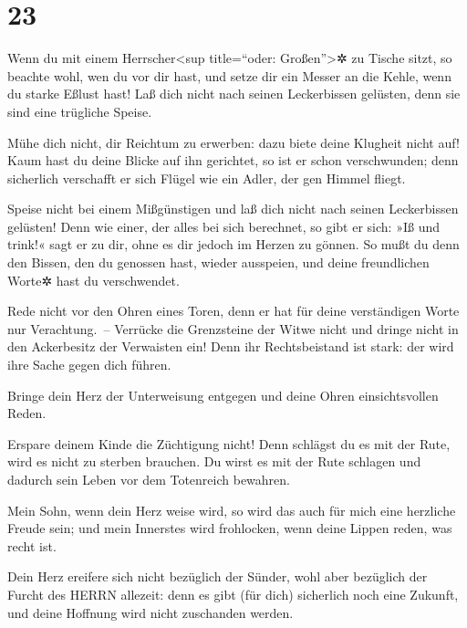 \hypertarget{section-22}{%
\section{23}\label{section-22}}

Wenn du mit einem Herrscher\textless sup title=``oder:
Großen''\textgreater✲ zu Tische sitzt, so beachte wohl, wen du vor dir
hast, und setze dir ein Messer an die Kehle, wenn du
starke Eßlust hast! Laß dich nicht nach seinen
Leckerbissen gelüsten, denn sie sind eine trügliche Speise.

Mühe dich nicht, dir Reichtum zu erwerben: dazu biete
deine Klugheit nicht auf! Kaum hast du deine Blicke auf
ihn gerichtet, so ist er schon verschwunden; denn sicherlich verschafft
er sich Flügel wie ein Adler, der gen Himmel fliegt.

Speise nicht bei einem Mißgünstigen und laß dich nicht
nach seinen Leckerbissen gelüsten! Denn wie einer, der
alles bei sich berechnet, so gibt er sich: »Iß und trink!« sagt er zu
dir, ohne es dir jedoch im Herzen zu gönnen. So mußt du
denn den Bissen, den du genossen hast, wieder ausspeien, und deine
freundlichen Worte✲ hast du verschwendet.

Rede nicht vor den Ohren eines Toren, denn er hat für
deine verständigen Worte nur Verachtung.~-- Verrücke die
Grenzsteine der Witwe nicht und dringe nicht in den Ackerbesitz der
Verwaisten ein! Denn ihr Rechtsbeistand ist stark: der
wird ihre Sache gegen dich führen.

Bringe dein Herz der Unterweisung entgegen und deine
Ohren einsichtsvollen Reden.

Erspare deinem Kinde die Züchtigung nicht! Denn schlägst
du es mit der Rute, wird es nicht zu sterben brauchen. Du
wirst es mit der Rute schlagen und dadurch sein Leben vor dem Totenreich
bewahren.

Mein Sohn, wenn dein Herz weise wird, so wird das auch
für mich eine herzliche Freude sein; und mein Innerstes
wird frohlocken, wenn deine Lippen reden, was recht ist.

Dein Herz ereifere sich nicht bezüglich der Sünder, wohl
aber bezüglich der Furcht des HERRN allezeit: denn es
gibt (für dich) sicherlich noch eine Zukunft, und deine Hoffnung wird
nicht zuschanden werden.


